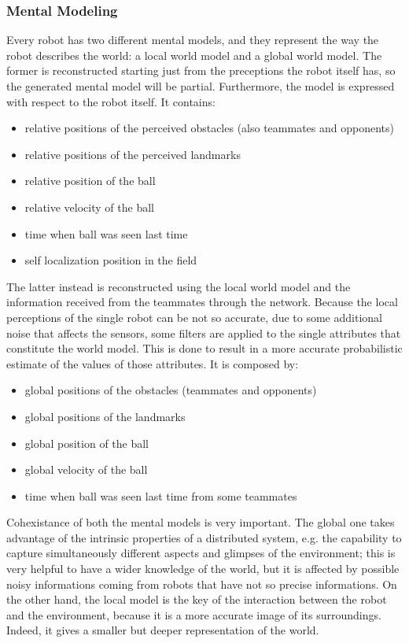 \documentclass[a4paper, onecolumn, 12pt]{article}
\begin{document}
\subsubsection{Mental Modeling}

Every robot has two different mental models, and they represent the way the robot 
describes the world: a local world model and a global world model.
The former is reconstructed starting just from the preceptions the robot itself has,
so the generated mental model will be partial. Furthermore, the model is expressed 
with respect to the robot itself.
It contains:
\begin{itemize}
    \item relative positions of the perceived obstacles (also teammates and opponents)
    \item relative positions of the perceived landmarks
    \item relative position of the ball
    \item relative velocity of the ball
    \item time when ball was seen last time
    \item self localization position in the field
\end{itemize}

The latter instead is reconstructed using the local world model and the information
received from the teammates through the network. Because the local perceptions of the 
single robot can be not so accurate, due to some additional noise that affects the sensors,
some filters are applied to the single attributes that constitute the world model. This 
is done to result in a more accurate probabilistic estimate of the values of those attributes.
It is composed by:
\begin{itemize}
    \item global positions of the obstacles (teammates and opponents)
    \item global positions of the landmarks
    \item global position of the ball
    \item global velocity of the ball
    \item time when ball was seen last time from some teammates
\end{itemize}

Cohexistance of both the mental models is very important.
The global one takes advantage of the intrinsic properties of a 
distributed system, e.g. the capability to capture simultaneously different
aspects and glimpses of the environment; this is very helpful to have a wider
knowledge of the world, but it is affected by possible noisy informations coming 
from robots that have not so precise informations.
On the other hand, the local model is the key of the interaction between the robot and
the environment, because it is a more accurate image of its surroundings.
Indeed, it gives a smaller but deeper representation of the world.
\end{document}
